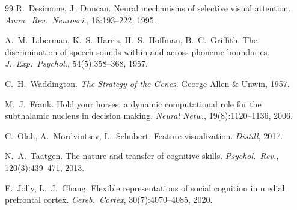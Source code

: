 \documentclass[11pt,a4paper]{article}
\begin{document}
\begin{thebibliography}{99}
R.~Desimone, J.~Duncan.
Neural mechanisms of selective visual attention.
\emph{Annu.\ Rev.\ Neurosci.}, 18:193--222, 1995.

A.~M.~Liberman, K.~S.~Harris, H.~S.~Hoffman, B.~C.~Griffith.
The discrimination of speech sounds within and across phoneme
boundaries.
\emph{J.\ Exp.\ Psychol.}, 54(5):358--368, 1957.

C.~H.~Waddington.
\emph{The Strategy of the Genes}.
George Allen \& Unwin, 1957.

M.~J.~Frank.
Hold your horses: a dynamic computational role for the subthalamic
nucleus in decision making.
\emph{Neural Netw.}, 19(8):1120--1136, 2006.

C.~Olah, A.~Mordvintsev, L.~Schubert.
Feature visualization.
\emph{Distill}, 2017.

N.~A.~Taatgen.
The nature and transfer of cognitive skills.
\emph{Psychol.\ Rev.}, 120(3):439--471, 2013.

E.~Jolly, L.~J.~Chang.
Flexible representations of social cognition in
medial prefrontal cortex.
\emph{Cereb.\ Cortex}, 30(7):4070--4085, 2020.

\end{thebibliography}
\end{document}
